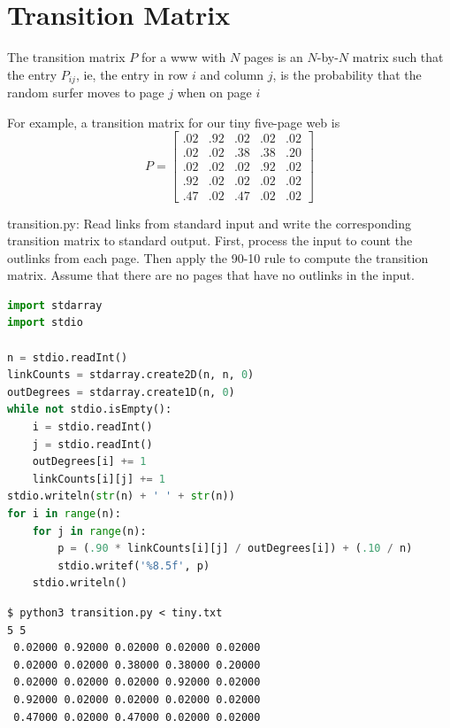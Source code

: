 \documentclass[8pt,a4paper,compress]{beamer}
\begin{document}
\section{Transition Matrix}
\begin{frame}[fragile]
\pause

The transition matrix $P$ for a www with $N$ pages is an $N$-by-$N$ matrix such that the entry $P_{ij}$, ie, the entry in row $i$ and column $j$, is the probability that the random surfer moves to page $j$ when on page $i$

\pause
\bigskip

For example, a transition matrix for our tiny five-page web is
\[
P = \begin{bmatrix}
.02 & .92 & .02 & .02 & .02 \\
.02 & .02 & .38 & .38 & .20 \\
.02 & .02 & .02 & .92 & .02 \\
.92 & .02 & .02 & .02 & .02 \\
.47 & .02 & .47 & .02 & .02
\end{bmatrix}
\]
\end{frame}
\begin{frame}[fragile]
\pause

\begin{framed}
\tiny transition.py: Read links from standard input and write the corresponding transition matrix to standard output. First, process the input to count the outlinks from each page. Then apply the 90-10 rule to compute the transition matrix. Assume that there are no pages that have no outlinks in the input.
\end{framed}

\begin{lstlisting}[language=Python]
import stdarray
import stdio

n = stdio.readInt()
linkCounts = stdarray.create2D(n, n, 0)
outDegrees = stdarray.create1D(n, 0)
while not stdio.isEmpty():
    i = stdio.readInt()
    j = stdio.readInt()
    outDegrees[i] += 1
    linkCounts[i][j] += 1
stdio.writeln(str(n) + ' ' + str(n))
for i in range(n):
    for j in range(n):
        p = (.90 * linkCounts[i][j] / outDegrees[i]) + (.10 / n)
        stdio.writef('%8.5f', p)
    stdio.writeln()
\end{lstlisting}

\pause

\begin{lstlisting}[language={}]
$ python3 transition.py < tiny.txt
5 5
 0.02000 0.92000 0.02000 0.02000 0.02000
 0.02000 0.02000 0.38000 0.38000 0.20000
 0.02000 0.02000 0.02000 0.92000 0.02000
 0.92000 0.02000 0.02000 0.02000 0.02000
 0.47000 0.02000 0.47000 0.02000 0.02000
\end{lstlisting}
\end{frame}
\end{document}
